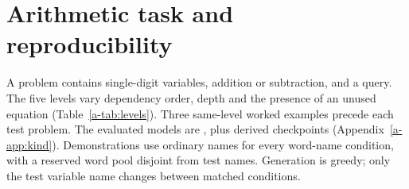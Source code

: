\section{Arithmetic task and reproducibility}
\label{a-app:task}

\begin{table}[t]
\centering\small
{}
\caption{Matched names preserve the arithmetic. The misleading digit, 4, occurs nowhere else.}
\label{a-tab:conditions}
\end{table}
A problem contains single-digit variables, addition or subtraction, and a query. The five
levels vary dependency order, depth and the presence of an unused equation
(Table~\ref{a-tab:levels}). Three same-level worked examples precede each test problem.
The evaluated models are , plus  derived checkpoints
(Appendix~\ref{a-app:kind}). Demonstrations use ordinary names for every word-name
condition, with a reserved word pool disjoint from test names. Generation is greedy;
only the test variable name changes between matched conditions.

\begin{table}[t]
\centering\small\setlength{\tabcolsep}{4pt}
\caption{The five levels of \citet{kudo2026faithful}: additions or subtractions needed
(\emph{Steps}), variables unresolved when first read (\emph{Held}), and unused equations
(\emph{Distr.}). At level~1 the intermediate value is stated rather than computed.}
\label{a-tab:levels}
\end{table}

